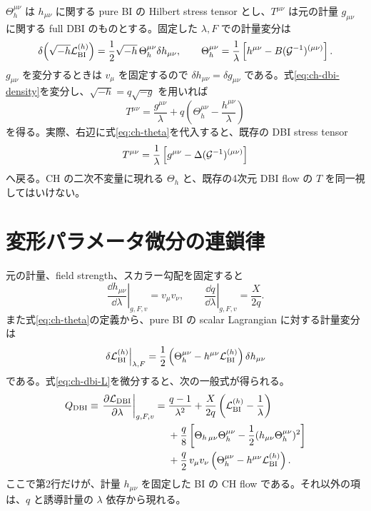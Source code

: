 $\Theta_h^{\mu\nu}$ は $h_{\mu\nu}$ に関する pure BI の Hilbert stress tensor とし、$T^{\mu\nu}$ は元の計量 $g_{\mu\nu}$ に関する full DBI のものとする。固定した $\lambda,F$ での計量変分は
\begin{equation}
 \delta\!\left(\sqrt{-h}\mathcal L_{\mathrm{BI}}^{(h)}\right)
 =\frac12\sqrt{-h}\,\Theta_h^{\mu\nu}\delta h_{\mu\nu},
 \qquad
 \Theta_h^{\mu\nu}=\frac1\lambda
 \left[h^{\mu\nu}-B(\mathcal G^{-1})^{(\mu\nu)}\right].
 \label{eq:ch-theta}
\end{equation}
$g_{\mu\nu}$ を変分するときは $v_\mu$ を固定するので $\delta h_{\mu\nu}=\delta g_{\mu\nu}$ である。式\eqref{eq:ch-dbi-density}を変分し、$\sqrt{-h}=q\sqrt{-g}$ を用いれば
\begin{equation}
 T^{\mu\nu}=\frac{g^{\mu\nu}}{\lambda}
 +q\left(\Theta_h^{\mu\nu}-\frac{h^{\mu\nu}}{\lambda}\right)
 \label{eq:ch-stress-relation}
\end{equation}
を得る。実際、右辺に式\eqref{eq:ch-theta}を代入すると、既存の DBI stress tensor
\begin{equation}
 T^{\mu\nu}=\frac1\lambda
 \left[g^{\mu\nu}-\Delta(\mathcal G^{-1})^{(\mu\nu)}\right]
 \label{eq:ch-stress-direct}
\end{equation}
へ戻る。CH の二次不変量に現れる $\Theta_h$ と、既存の4次元 DBI flow の $T$ を同一視してはいけない。

\section{変形パラメータ微分の連鎖律}

元の計量、field strength、スカラー勾配を固定すると
\begin{equation}
 \left.\frac{\dd h_{\mu\nu}}{\dd\lambda}\right|_{g,F,v}
 =v_\mu v_\nu,\qquad
 \left.\frac{\dd q}{\dd\lambda}\right|_{g,F,v}
 =\frac{X}{2q}.
 \label{eq:ch-h-derivatives}
\end{equation}
また式\eqref{eq:ch-theta}の定義から、pure BI の scalar Lagrangian に対する計量変分は
\begin{equation}
 \left.\delta\mathcal L_{\mathrm{BI}}^{(h)}\right|_{\lambda,F}
 =\frac12\left(\Theta_h^{\mu\nu}
 -h^{\mu\nu}\mathcal L_{\mathrm{BI}}^{(h)}\right)\delta h_{\mu\nu}
 \label{eq:ch-bi-L-metric-variation}
\end{equation}
である。式\eqref{eq:ch-dbi-L}を微分すると、次の一般式が得られる。
\begin{align}
 Q_{\mathrm{DBI}}\equiv
 \left.\frac{\partial\mathcal L_{\mathrm{DBI}}}{\partial\lambda}\right|_{g,F,v}
 ={}&\frac{q-1}{\lambda^2}
 +\frac{X}{2q}\left(\mathcal L_{\mathrm{BI}}^{(h)}-\frac1\lambda\right)
 \nonumber\\
 &+\frac q8\left[\Theta_{h\,\mu\nu}\Theta_h^{\mu\nu}
 -\frac12(h_{\mu\nu}\Theta_h^{\mu\nu})^2\right]
 \nonumber\\
 &+\frac q2\,v_\mu v_\nu
 \left(\Theta_h^{\mu\nu}-h^{\mu\nu}\mathcal L_{\mathrm{BI}}^{(h)}\right).
 \label{eq:ch-dbi-chain-flow}
\end{align}
ここで第2行だけが、計量 $h_{\mu\nu}$ を固定した BI の CH flow である。それ以外の項は、$q$ と誘導計量の $\lambda$ 依存から現れる。

